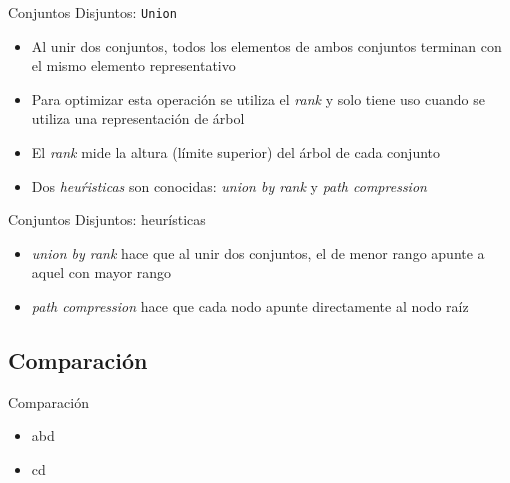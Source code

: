 \documentclass[]{beamer}
\begin{document}
\begin{frame}{Conjuntos Disjuntos: \texttt{Union}}
  \begin{itemize}
    \item Al unir dos conjuntos, todos los elementos de ambos conjuntos terminan con el mismo elemento representativo
      \pause
    \item Para optimizar esta operaci\'on se utiliza el \textit{rank} y solo tiene uso cuando se utiliza una representaci\'on de \'arbol
      \pause
    \item El \textit{rank} mide la altura (l\'imite superior) del \'arbol de cada conjunto
      \pause
    \item Dos \textit{heu\'risticas} son conocidas: \textit{union by rank} y \textit{path compression}
  \end{itemize}
\end{frame}

\begin{frame}{Conjuntos Disjuntos: heur\'isticas}
  \begin{itemize}
    \item \textit{union by rank} hace que al unir dos conjuntos, el de menor rango apunte a aquel con mayor rango
      \pause
    \item \textit{path compression} hace que cada nodo apunte directamente al nodo ra\'iz
  \end{itemize}
\end{frame}


\subsection{Comparaci\'on}
\begin{frame}{Comparaci\'on}
  \begin{itemize}
    \item abd
      \pause
    \item cd
  \end{itemize}
\end{frame}
\end{document}
